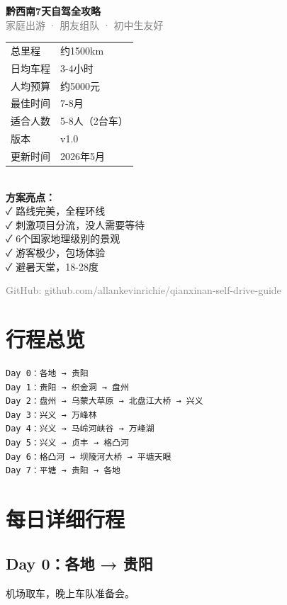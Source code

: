 \documentclass[12pt,a4paper,UTF8]{ctexart}
\begin{document}
\begin{titlepage}
\centering
\vspace*{2cm}
\Huge \textbf{\textcolor{primary}{黔西南7天自驾全攻略}}
\\[0.5cm]
\Large \textcolor{gray}{家庭出游 · 朋友组队 · 初中生友好}
\\[2cm]

\begin{tabular}{ll}
\toprule
总里程 & 约1500km \\
日均车程 & 3-4小时 \\
人均预算 & 约5000元 \\
最佳时间 & 7-8月 \\
适合人数 & 5-8人（2台车） \\
版本 & v1.0 \\
更新时间 & 2026年5月 \\
\bottomrule
\end{tabular}

\\[2cm]

\textbf{方案亮点：}
\\
✓ 路线完美，全程环线
\\
✓ 刺激项目分流，没人需要等待
\\
✓ 6个国家地理级别的景观
\\
✓ 游客极少，包场体验
\\
✓ 避暑天堂，18-28度

\vfill
\textcolor{gray}{\small GitHub: github.com/allankevinrichie/qianxinan-self-drive-guide}
\end{titlepage}

\newpage
\tableofcontents
\newpage

\section{行程总览}
\begin{verbatim}
Day 0：各地 → 贵阳
Day 1：贵阳 → 织金洞 → 盘州
Day 2：盘州 → 乌蒙大草原 → 北盘江大桥 → 兴义
Day 3：兴义 → 万峰林
Day 4：兴义 → 马岭河峡谷 → 万峰湖
Day 5：兴义 → 贞丰 → 格凸河
Day 6：格凸河 → 坝陵河大桥 → 平塘天眼
Day 7：平塘 → 贵阳 → 各地
\end{verbatim}

\section{每日详细行程}
\subsection{Day 0：各地 → 贵阳}
机场取车，晚上车队准备会。
\end{document}
